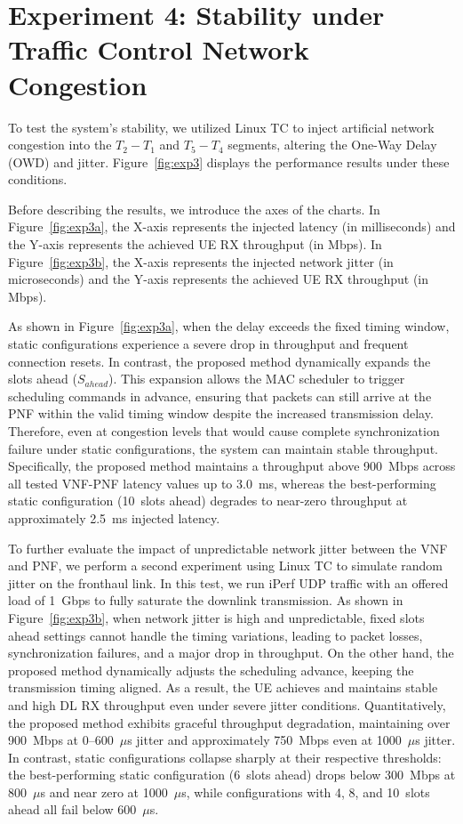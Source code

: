 \documentclass[../my_ntust_thesis.tex]{subfiles}
\begin{document}
\section{Experiment 4: Stability under Traffic Control Network Congestion}
\label{subsec:scenario_3}

To test the system's stability, we utilized Linux TC to inject artificial network congestion into the $T_2-T_1$ and $T_5-T_4$ segments, altering the One-Way Delay (OWD) and jitter. Figure~\ref{fig:exp3} displays the performance results under these conditions.

Before describing the results, we introduce the axes of the charts. In Figure~\ref{fig:exp3a}, the X-axis represents the injected latency (in milliseconds) and the Y-axis represents the achieved UE RX throughput (in Mbps). In Figure~\ref{fig:exp3b}, the X-axis represents the injected network jitter (in microseconds) and the Y-axis represents the achieved UE RX throughput (in Mbps).

As shown in Figure~\ref{fig:exp3a}, when the delay exceeds the fixed timing window, static configurations experience a severe drop in throughput and frequent connection resets. In contrast, the proposed method dynamically expands the slots ahead ($S_{ahead}$). This expansion allows the MAC scheduler to trigger scheduling commands in advance, ensuring that packets can still arrive at the PNF within the valid timing window despite the increased transmission delay. Therefore, even at congestion levels that would cause complete synchronization failure under static configurations, the system can maintain stable throughput. Specifically, the proposed method maintains a throughput above 900~Mbps across all tested VNF-PNF latency values up to 3.0~ms, whereas the best-performing static configuration (10~slots ahead) degrades to near-zero throughput at approximately 2.5~ms injected latency.

To further evaluate the impact of unpredictable network jitter between the VNF and PNF, we perform a second experiment using Linux TC to simulate random jitter on the fronthaul link. In this test, we run iPerf UDP traffic with an offered load of 1~Gbps to fully saturate the downlink transmission. As shown in Figure~\ref{fig:exp3b}, when network jitter is high and unpredictable, fixed slots ahead settings cannot handle the timing variations, leading to packet losses, synchronization failures, and a major drop in throughput. On the other hand, the proposed method dynamically adjusts the scheduling advance, keeping the transmission timing aligned. As a result, the UE achieves and maintains stable and high DL RX throughput even under severe jitter conditions. Quantitatively, the proposed method exhibits graceful throughput degradation, maintaining over 900~Mbps at 0--600~$\mu$s jitter and approximately 750~Mbps even at 1000~$\mu$s jitter. In contrast, static configurations collapse sharply at their respective thresholds: the best-performing static configuration (6~slots ahead) drops below 300~Mbps at 800~$\mu$s and near zero at 1000~$\mu$s, while configurations with 4, 8, and 10~slots ahead all fail below 600~$\mu$s.
\end{document}
